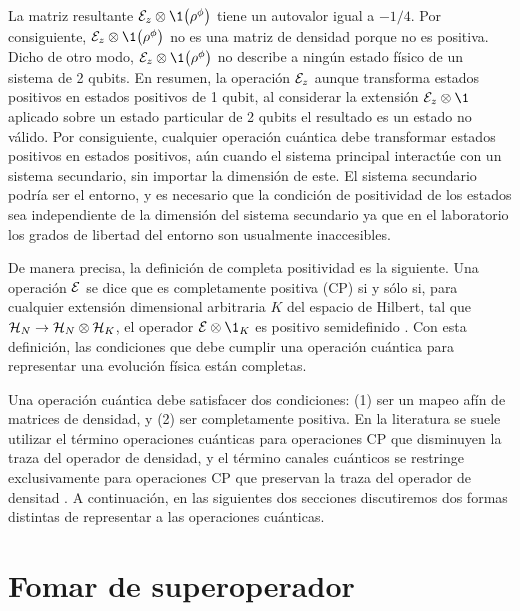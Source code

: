La matriz resultante $\E_z\otimes\1\qty(\rho^{\phi})$ tiene un 
autovalor igual a $-1/4$.
Por consiguiente, $\E_z\otimes\1\qty(\rho^{\phi})$ no es una matriz 
de densidad porque no es positiva.  
Dicho de otro modo, $\E_z\otimes\1\qty(\rho^{\phi})$ 
no describe a ningún estado físico de un sistema de 2 qubits.
En resumen, la operación $\mathcal{E}_z$ aunque transforma estados positivos
en estados positivos de 1 qubit, al considerar la extensión $\E_z\otimes\1$
aplicado sobre un estado particular de 2 qubits el resultado es un 
estado no válido. Por consiguiente, cualquier operación cuántica 
debe transformar estados positivos en estados positivos,
aún cuando el sistema principal interactúe con un sistema secundario,
sin importar la dimensión de este. El sistema secundario podría ser
el entorno, y es necesario que la condición de positividad de los estados
sea independiente de la dimensión del sistema secundario ya que 
en el laboratorio los grados de libertad del entorno son usualmente inaccesibles.


De manera precisa, la definición de completa positividad es la siguiente.
Una operación $\mathcal{E}$ se dice que es completamente positiva (CP)
si y sólo si, para cualquier extensión dimensional arbitraria $K$ 
del espacio de Hilbert, tal que 
$\mathcal{H}_N \rightarrow \mathcal{H}_N \otimes \mathcal{H}_K$,
el operador $\E\otimes\1_K$ es positivo semidefinido 
\cite{bengtsson_zyczkowski_2017}. Con esta definición, las condiciones 
que debe cumplir una operación cuántica para representar una evolución física 
están completas.


Una operación cuántica debe satisfacer dos condiciones: (1)
ser un mapeo afín de matrices de densidad, y (2) ser completamente positiva. 
En la literatura se suele utilizar el término operaciones 
cuánticas para operaciones CP que disminuyen la traza 
del operador de densidad, y el término canales cuánticos 
se restringe exclusivamente para operaciones CP
que preservan la traza del 
operador de densitad \cite{bengtsson_zyczkowski_2017}. 
A continuación, en las siguientes dos secciones discutiremos 
dos formas distintas de representar a las operaciones cuánticas.




\section{Fomar de superoperador}

